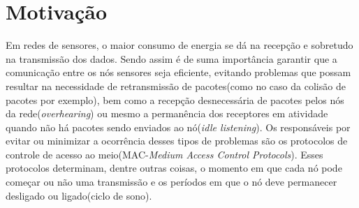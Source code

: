 \section{Motivação}

Em redes de sensores, o maior consumo de energia se dá na recepção e sobretudo na transmissão dos dados. Sendo assim é de suma importância garantir que a comunicação entre os nós sensores seja eficiente, evitando problemas que possam resultar na necessidade de retransmissão de pacotes(como no caso da colisão de pacotes por exemplo), bem como a recepção desnecessária de pacotes pelos nós da rede(\emph{overhearing}) ou mesmo a permanência dos receptores em atividade quando não há pacotes sendo enviados ao nó(\emph{idle listening}). Os responsáveis por evitar ou minimizar a ocorrência desses tipos de problemas são os protocolos de controle de acesso ao meio(MAC-\emph{Medium Access Control Protocols}). Esses protocolos determinam, dentre outras coisas, o momento em que cada nó pode começar ou não uma transmissão e os períodos em que o nó deve permanecer desligado ou ligado(ciclo de sono).